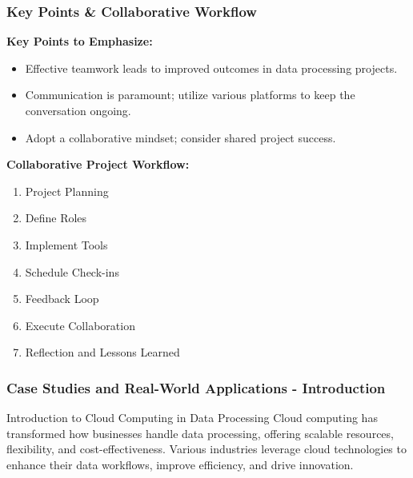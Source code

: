 \documentclass[aspectratio=169]{beamer}
\begin{document}
\begin{frame}[fragile]
  \frametitle{Key Points & Collaborative Workflow}
  \textbf{Key Points to Emphasize:}
  \begin{itemize}
    \item Effective teamwork leads to improved outcomes in data processing projects.
    \item Communication is paramount; utilize various platforms to keep the conversation ongoing.
    \item Adopt a collaborative mindset; consider shared project success.
  \end{itemize}

  \textbf{Collaborative Project Workflow:}
  \begin{enumerate}
    \item Project Planning
    \item Define Roles
    \item Implement Tools
    \item Schedule Check-ins
    \item Feedback Loop
    \item Execute Collaboration
    \item Reflection and Lessons Learned
  \end{enumerate}
\end{frame}

\begin{frame}[fragile]
    \frametitle{Case Studies and Real-World Applications - Introduction}
    \begin{block}{Introduction to Cloud Computing in Data Processing}
        Cloud computing has transformed how businesses handle data processing, offering scalable resources, flexibility, and cost-effectiveness. Various industries leverage cloud technologies to enhance their data workflows, improve efficiency, and drive innovation.
    \end{block}
\end{frame}
\end{document}
